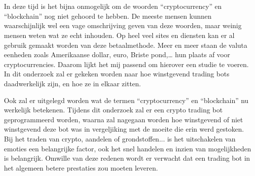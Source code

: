 
\chapter*{}
\label{ch:voorwoord}


In deze tijd is het bijna onmogelijk om de woorden “cryptocurrency” en “blockchain” nog niet gehoord te hebben. De meeste mensen kunnen waarschijnlijk wel een vage omschrijving geven van deze woorden, maar weinig mensen weten wat ze echt inhouden. Op heel veel sites en diensten kan er al gebruik gemaakt worden van deze betaalmethode. Meer en meer staan de valuta eenheden zoals Amerikaanse dollar, euro, Briste pond,… hun plaats af voor cryptocurrencies. Daarom lijkt het mij passend om hierover een studie te voeren. In dit onderzoek zal er gekeken worden naar hoe winstgevend trading bots daadwerkelijk zijn, en hoe ze in elkaar zitten.

Ook zal er uitgelegd worden wat de termen “cryptocurrency” en “blockchain” nu werkelijk betekenen. Tijdens dit onderzoek zal er een crypto trading bot geprogrammeerd worden, waarna zal nagegaan worden hoe winstgevend of niet winstgevend deze bot was in vergeljiking met de moeite die erin werd gestoken. Bij het traden van crypto, aandelen of grondstoffen... is het uitschakelen van emoties een belangrijke factor, ook het snel handelen en inzien van mogelijkheden is belangrijk. Omwille van deze redenen wordt er verwacht dat een trading bot in het algemeen betere prestaties zou moeten leveren.